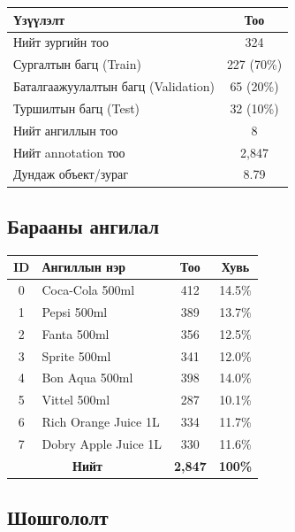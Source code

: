 \begin{table}[H]
\centering
\caption{Өгөгдөл бүрдүүлэлтийн статистик}
\label{tab:dataset_stats}
\begin{longtable}{|l|c|}
\hline
\textbf{Үзүүлэлт} & \textbf{Тоо} \\
\hline
Нийт зургийн тоо & 324 \\
\hline
Сургалтын багц (Train) & 227 (70\%) \\
\hline
Баталгаажуулалтын багц (Validation) & 65 (20\%) \\
\hline
Туршилтын багц (Test) & 32 (10\%) \\
\hline
Нийт ангиллын тоо & 8 \\
\hline
Нийт annotation тоо & 2,847 \\
\hline
Дундаж объект/зураг & 8.79 \\
\hline
\end{longtable}
\end{table}

\subsection{Барааны ангилал}

\begin{table}[H]
\centering
\caption{Барааны ангиллын жагсаалт}
\label{tab:product_classes}
\begin{longtable}{|c|l|c|c|}
\hline
\textbf{ID} & \textbf{Ангиллын нэр} & \textbf{Тоо} & \textbf{Хувь} \\
\hline
0 & Coca-Cola 500ml & 412 & 14.5\% \\
\hline
1 & Pepsi 500ml & 389 & 13.7\% \\
\hline
2 & Fanta 500ml & 356 & 12.5\% \\
\hline
3 & Sprite 500ml & 341 & 12.0\% \\
\hline
4 & Bon Aqua 500ml & 398 & 14.0\% \\
\hline
5 & Vittel 500ml & 287 & 10.1\% \\
\hline
6 & Rich Orange Juice 1L & 334 & 11.7\% \\
\hline
7 & Dobry Apple Juice 1L & 330 & 11.6\% \\
\hline
\multicolumn{2}{|c|}{\textbf{Нийт}} & \textbf{2,847} & \textbf{100\%} \\
\hline
\end{longtable}
\end{table}

\subsection{Шошгололт}

